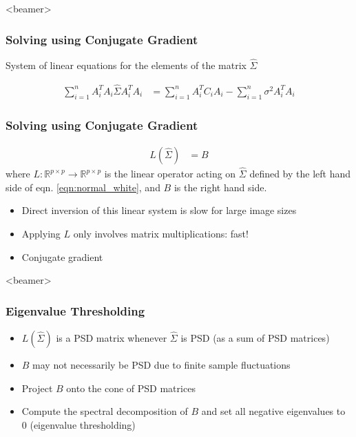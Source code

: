 \documentclass{beamer}
\begin{document}
\begin{frame}<beamer>
\frametitle{Solving using Conjugate Gradient}
System of linear equations for the elements of the matrix $\hat \Sigma$

\begin{equation}
\begin{aligned}
\sum_{i=1}^n  A_i^T  A_i \hat \Sigma A_i^T A_i
&= \sum_{i=1}^n A_i^T C_i A_i - \sum_{i=1}^n \sigma^2 A_i^T A_i 
\end{aligned}
\label{eqn:normal_white}
\end{equation}
\frametitle{Solving using Conjugate Gradient}
\begin{equation}
\begin{aligned}
L(\hat\Sigma) 
&=  B 
\label{eqn:cg}
\end{aligned}
\end{equation}
where $L:\mathbb{R}^{p\times p} \to \mathbb{R}^{p\times p}$ is the linear operator acting on $\hat{\Sigma}$ defined by the left hand side of eqn. \ref{eqn:normal_white}, and $B$ is the right hand side.

\begin{itemize}
 \item Direct inversion of this linear system is slow for large image sizes
 \item Applying $L$ only involves matrix multiplications: fast!
 \item Conjugate gradient 
\end{itemize}

\end{frame}


\begin{frame}<beamer>
\frametitle{Eigenvalue Thresholding}
\begin{itemize}[]
 \item  $L(\hat{\Sigma})$ is a PSD matrix whenever $\hat{\Sigma}$ is PSD (as 
a sum of PSD matrices)
\item  $B$ may not necessarily be PSD due to finite 
sample fluctuations 
\item  Project $B$ onto the cone of PSD matrices
\item  Compute the spectral 
decomposition of $B$ and set all negative eigenvalues to 0  (eigenvalue thresholding)
\end{itemize}
\end{frame}
\end{document}
